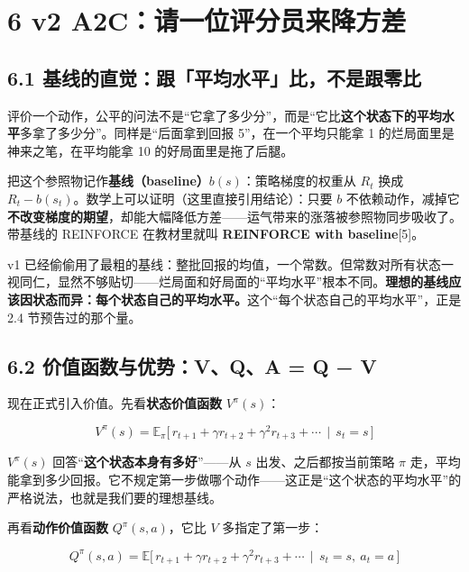 \documentclass[
  chinese,
]{ctexart}
\begin{document}
\section{6 v2
A2C：请一位评分员来降方差}\label{v2-a2cux8bf7ux4e00ux4f4dux8bc4ux5206ux5458ux6765ux964dux65b9ux5dee}

\subsection{6.1
基线的直觉：跟「平均水平」比，不是跟零比}\label{ux57faux7ebfux7684ux76f4ux89c9ux8ddfux5e73ux5747ux6c34ux5e73ux6bd4ux4e0dux662fux8ddfux96f6ux6bd4}

评价一个动作，公平的问法不是``它拿了多少分''，而是``它比\textbf{这个状态下的平均水平}多拿了多少分''。同样是``后面拿到回报
5''，在一个平均只能拿 1 的烂局面里是神来之笔，在平均能拿 10
的好局面里是拖了后腿。

把这个参照物记作\textbf{基线（baseline）}\(b(s)\)：策略梯度的权重从
\(R_t\) 换成 \(R_t - b(s_t)\)。数学上可以证明（这里直接引用结论）：只要
\(b\)
不依赖动作，减掉它\textbf{不改变梯度的期望}，却能大幅降低方差------运气带来的涨落被参照物同步吸收了。带基线的
REINFORCE 在教材里就叫 \textbf{REINFORCE with baseline}{[}5{]}。

v1
已经偷偷用了最粗的基线：整批回报的均值，一个常数。但常数对所有状态一视同仁，显然不够贴切------烂局面和好局面的``平均水平''根本不同。\textbf{理想的基线应该因状态而异：每个状态自己的平均水平。}这个``每个状态自己的平均水平''，正是
2.4 节预告过的那个量。

\subsection{6.2 价值函数与优势：V、Q、A = Q −
V}\label{ux4ef7ux503cux51fdux6570ux4e0eux4f18ux52bfvqa-q-v}

现在正式引入价值。先看\textbf{状态价值函数} \(V^\pi(s)\)：

\[
V^\pi(s)=\mathbb{E}_{\pi}\big[\,r_{t+1}+\gamma r_{t+2}+\gamma^2 r_{t+3}+\cdots \,\mid\, s_t=s\,\big]
\]

\(V^\pi(s)\) 回答``\textbf{这个状态本身有多好}''------从 \(s\)
出发、之后都按当前策略 \(\pi\)
走，平均能拿到多少回报。它不规定第一步做哪个动作------这正是``这个状态的平均水平''的严格说法，也就是我们要的理想基线。

再看\textbf{动作价值函数} \(Q^\pi(s,a)\)，它比 \(V\) 多指定了第一步：

\[
Q^\pi(s,a)=\mathbb{E}\big[\,r_{t+1}+\gamma r_{t+2}+\gamma^2 r_{t+3}+\cdots \,\mid\, s_t=s,\ a_t=a\,\big]
\]
\end{document}
